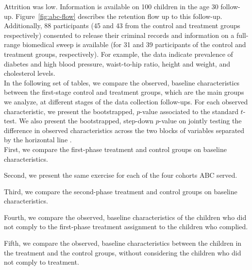 \begin{appendices}
\noindent Attrition was low. Information is available on 100 children in the age 30 follow-up. Figure~\ref{fig:abc-flow} describes the retention flow up to this follow-up. Additionally, 88 participants (45 and 43 from the control and treatment groups respectively) consented to release their criminal records and information on a full-range biomedical sweep is available (for 31 and 39 participants of the control and treatment groups, respectively). For example, the data indicate prevalence of diabetes and high blood pressure, waist-to-hip ratio, height and weight, and cholesterol levels.\\ 

\noindent In the following set of tables, we compare the observed, baseline characteristics between the first-stage control and treatment groups, which are the main groups we analyze, at different stages of the data collection follow-ups. For each observed characteristic, we present the bootstrapped, $p$-value associated to the standard $t$-test. We also present the bootstrapped, step-down $p$-value on jointly testing the difference in observed characteristics across the two blocks of variables separated by the horizontal line \citep{Lehmann_Romano_2005_testing}.\\

\noindent First, we compare the first-phase treatment and control groups on baseline characteristics. 



\noindent Second, we present the same exercise for each of the four cohorts ABC served.









\noindent Third, we compare the second-phase treatment and control groups on baseline characteristics. 



\noindent Fourth, we compare the observed, baseline characteristics of the children who did not comply to the first-phase treatment assignment to the children who complied.



\noindent Fifth, we compare the observed, baseline characteristics between the children in the treatment and the control groups, without considering the children who did not comply to treatment.


\end{appendices}

